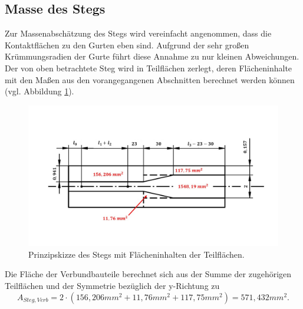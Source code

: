 \subsection{Masse des Stegs}
Zur Massenabschätzung des Stegs wird vereinfacht angenommen, dass die Kontaktflächen zu den Gurten eben sind. Aufgrund der sehr großen Krümmungsradien der Gurte führt diese Annahme zu nur kleinen Abweichungen.  
Der von oben betrachtete Steg wird in Teilflächen zerlegt, deren Flächeninhalte mit den Maßen aus den vorangegangenen Abschnitten berechnet werden können (vgl. Abbildung \ref{fig: StegFlaeche}).
\begin{figure}[h]
	\includegraphics[width=1.0\textwidth]{Bilder/Stegflaeche.jpg}
	\caption{Prinzipskizze des Stegs mit Flächeninhalten der Teilflächen.}
	\label{fig: StegFlaeche}
\end{figure}
Die Fläche der Verbundbauteile berechnet sich aus der Summe der zugehörigen Teilflächen und der Symmetrie bezüglich der y-Richtung zu
\begin{equation}
	A_{Steg,Verb}=2\cdot\left(156,206mm^{2}+11,76mm^{2}+117,75mm^{2}\right)
	=571,432mm^{2}.
\end{equation}

